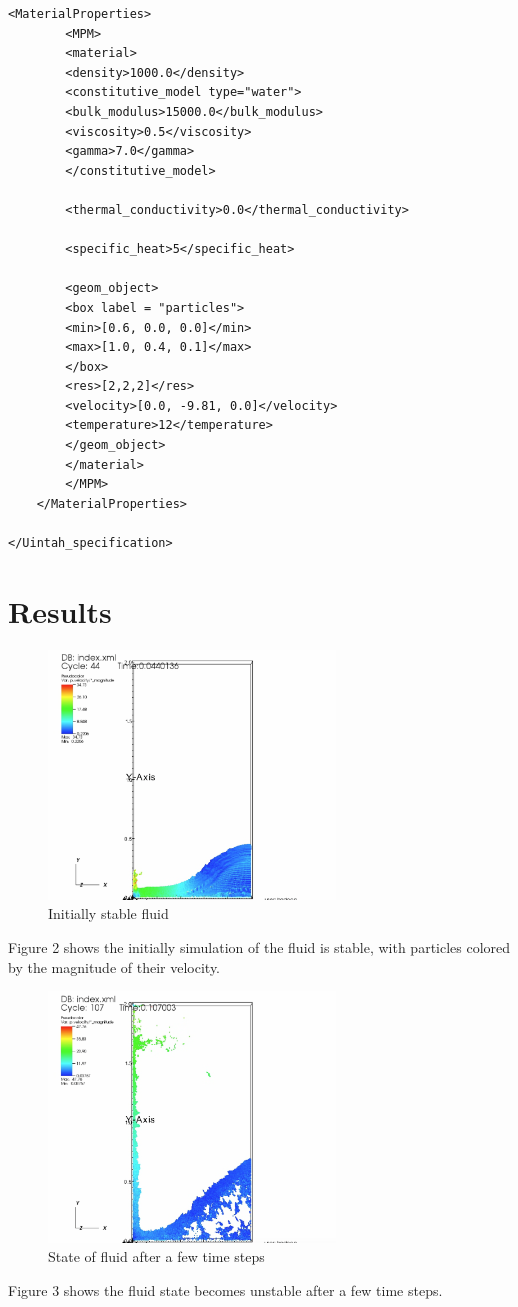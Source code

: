 \documentclass[a4paper, 11pt]{article}
\begin{document}
\begin{lstlisting}[frame=shadowbox,breaklines=true,basicstyle=\ttfamily\small]
	<MaterialProperties>
		<MPM>
		<material>
		<density>1000.0</density>
		<constitutive_model type="water">
		<bulk_modulus>15000.0</bulk_modulus>
		<viscosity>0.5</viscosity>
		<gamma>7.0</gamma>
		</constitutive_model>

		<thermal_conductivity>0.0</thermal_conductivity>

		<specific_heat>5</specific_heat>

		<geom_object>
		<box label = "particles">
		<min>[0.6, 0.0, 0.0]</min>
		<max>[1.0, 0.4, 0.1]</max>
		</box>
		<res>[2,2,2]</res>
		<velocity>[0.0, -9.81, 0.0]</velocity>
		<temperature>12</temperature>
		</geom_object>
		</material>
		</MPM>
	</MaterialProperties>

</Uintah_specification>
\end{lstlisting}

\section{Results}
\begin{figure}[H]
  \centering
  \includegraphics[width=3.0in]{images/1}
  \caption{Initially stable fluid}
\end{figure}
Figure 2 shows the initially simulation of the fluid is stable, with particles colored by the magnitude of their velocity.

\begin{figure}[H]
	\centering
	\includegraphics[width=3.0in]{images/2}
	\caption{State of fluid after a few time steps}
\end{figure}
Figure 3 shows the fluid state becomes unstable after a few time steps.
\end{document}
